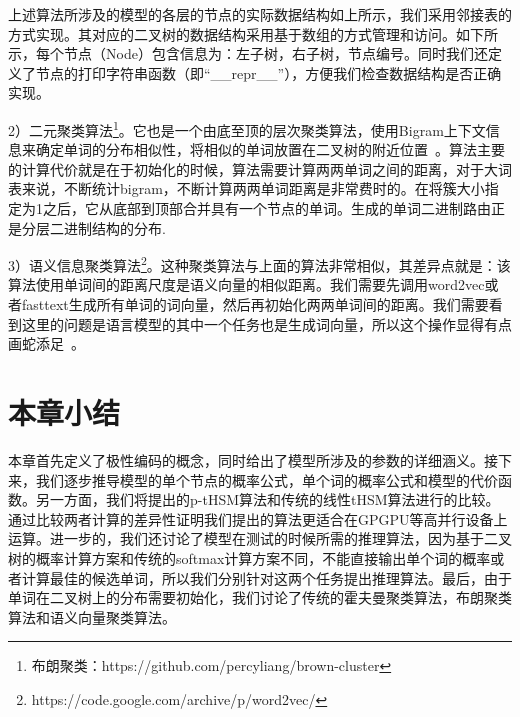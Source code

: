上述算法所涉及的模型的各层的节点的实际数据结构如上所示，我们采用邻接表的方式实现。其对应的二叉树的数据结构采用基于数组的方式管理和访问。如下所示，每个节点（Node）包含信息为：左子树，右子树，节点编号。同时我们还定义了节点的打印字符串函数（即``\_\_repr\_\_''），方便我们检查数据结构是否正确实现。



2）二元聚类算法\footnote{布朗聚类：https://github.com/percyliang/brown-cluster}。它也是一个由底至顶的层次聚类算法，使用Bigram上下文信息来确定单词的分布相似性，将相似的单词放置在二叉树的附近位置~。算法主要的计算代价就是在于初始化的时候，算法需要计算两两单词之间的距离，对于大词表来说，不断统计bigram，不断计算两两单词距离是非常费时的。在将簇大小指定为1之后，它从底部到顶部合并具有一个节点的单词。生成的单词二进制路由正是分层二进制结构的分布.%


3）语义信息聚类算法\footnote{https://code.google.com/archive/p/word2vec/}。这种聚类算法与上面的算法非常相似，其差异点就是：该算法使用单词间的距离尺度是语义向量的相似距离。我们需要先调用word2vec或者fasttext生成所有单词的词向量，然后再初始化两两单词间的距离。我们需要看到这里的问题是语言模型的其中一个任务也是生成词向量，所以这个操作显得有点画蛇添足~。


\section{本章小结}
本章首先定义了极性编码的概念，同时给出了模型所涉及的参数的详细涵义。接下来，我们逐步推导模型的单个节点的概率公式，单个词的概率公式和模型的代价函数。另一方面，我们将提出的p-tHSM算法和传统的线性tHSM算法进行的比较。通过比较两者计算的差异性证明我们提出的算法更适合在GPGPU等高并行设备上运算。进一步的，我们还讨论了模型在测试的时候所需的推理算法，因为基于二叉树的概率计算方案和传统的softmax计算方案不同，不能直接输出单个词的概率或者计算最佳的候选单词，所以我们分别针对这两个任务提出推理算法。最后，由于单词在二叉树上的分布需要初始化，我们讨论了传统的霍夫曼聚类算法，布朗聚类算法和语义向量聚类算法。

